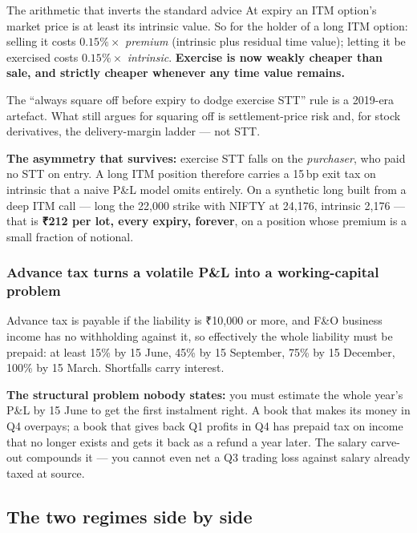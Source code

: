 \documentclass[11pt,a4paper]{article}
\newcommand{\rs}{₹}
\begin{document}
\begin{keyfact}{The arithmetic that inverts the standard advice}
At expiry an ITM option's market price is at least its intrinsic value. So for the
holder of a long ITM option: selling it costs $0.15\% \times$ \emph{premium}
(intrinsic plus residual time value); letting it be exercised costs $0.15\%
\times$ \emph{intrinsic}. \textbf{Exercise is now weakly cheaper than sale, and
strictly cheaper whenever any time value remains.}

The ``always square off before expiry to dodge exercise STT'' rule is a 2019-era
artefact. What still argues for squaring off is settlement-price risk and, for
stock derivatives, the delivery-margin ladder --- not STT.
\end{keyfact}

\textbf{The asymmetry that survives:} exercise STT falls on the \emph{purchaser},
who paid no STT on entry. A long ITM position therefore carries a 15\,bp exit tax
on intrinsic that a naive P\&L model omits entirely. On a synthetic long built
from a deep ITM call --- long the 22{,}000 strike with NIFTY at 24{,}176,
intrinsic 2{,}176 --- that is \textbf{\rs 212 per lot, every expiry, forever}, on
a position whose premium is a small fraction of notional.

\subsubsection{Advance tax turns a volatile P\&L into a working-capital problem}

Advance tax is payable if the liability is \rs 10{,}000 or more, and F\&O business
income has no withholding against it, so effectively the whole liability must be
prepaid: at least 15\% by 15 June, 45\% by 15 September, 75\% by 15 December, 100\%
by 15 March. Shortfalls carry interest.

\textbf{The structural problem nobody states:} you must estimate the whole year's
P\&L by 15 June to get the first instalment right. A book that makes its money in
Q4 overpays; a book that gives back Q1 profits in Q4 has prepaid tax on income that
no longer exists and gets it back as a refund a year later. The salary carve-out
compounds it --- you cannot even net a Q3 trading loss against salary already taxed
at source.

\subsection{The two regimes side by side}
\end{document}
